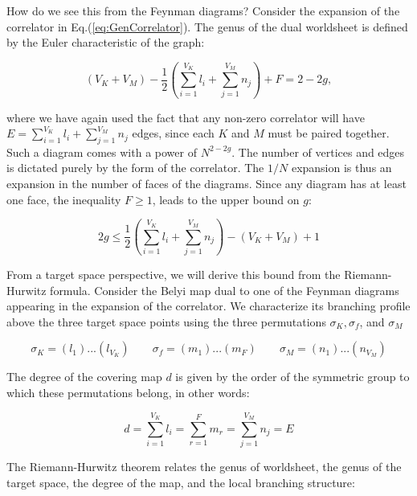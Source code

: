 \documentclass[english]{article}
\renewcommand{\>}{\rangle}
\newcommand{\<}{\langle}
\renewcommand{\(}{\left(}
\renewcommand{\)}{\right)}
\begin{document}
How do we see this from the Feynman diagrams? Consider the expansion of the correlator in Eq.(\ref{eq:GenCorrelator}). The genus of the dual worldsheet is defined by the Euler characteristic of the graph:

\begin{equation}
    (V_{K}+V_{M})- \frac{1}{2} \left( \sum_{i=1}^{V_{K}} l_{i} + \sum_{j=1}^{V_{M}} n_{j} \right) + F = 2-2g,
\end{equation}

where we have again used the fact that any non-zero correlator will have $E=\sum_{i=1}^{V_{K}} l_{i} + \sum_{j=1}^{V_{M}} n_{j} $ edges, since each $K$ and $M$ must be paired together. Such a diagram comes with a power of $N^{2-2g}$. The number of vertices and edges is dictated purely by the form of the correlator. The $1/N$ expansion is thus an expansion in the number of faces of the diagrams. Since any diagram has at least one face, the inequality $F \geq 1$, leads to the upper bound on $g$:

\begin{equation}
    2g \leq  \frac{1}{2} \left( \sum_{i=1}^{V_{K}} l_{i} + \sum_{j=1}^{V_{M}} n_{j} \right) - (V_{K}+V_{M})+1 \label{eq:maxgen}
\end{equation}

From a target space perspective, we will derive this bound from the Riemann-Hurwitz formula. Consider the Belyi map dual to one of the Feynman diagrams appearing in the expansion of the correlator. We characterize its branching profile above the three target space points using the three permutations $\sigma_{K},\sigma_{f}$, and $\sigma_{M}$

\begin{equation}
    \sigma_{K} = (l_1)...(l_{V_{K}}) \qquad  \sigma_{f} = (m_1)...(m_{F}) \qquad  \sigma_{M}= (n_1)...(n_{V_{M}}) \label{eq:branchingstructure}
\end{equation}
   

The degree of the covering map $d$ is given by the order of the symmetric group to which these permutations belong, in other words:

\begin{equation}
    d = \sum_{i=1}^{V_{K}} l_{i} = \sum_{r=1}^{F} m_{r} = \sum_{j=1}^{V_{M}} n_{j} = E
\end{equation}

The Riemann-Hurwitz theorem relates the genus of worldsheet, the genus of the target space, the degree of the map, and the local branching structure: 
\end{document}
